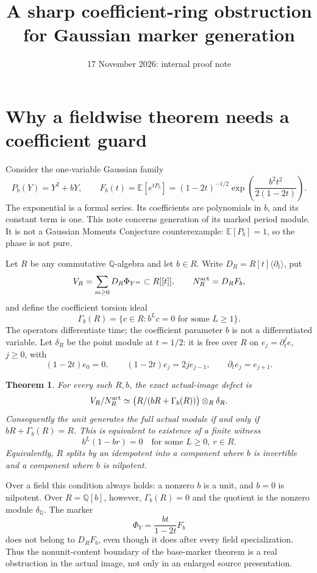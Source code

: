 \documentclass[11pt]{article}
\title{A sharp coefficient-ring obstruction\\for Gaussian marker generation}
\author{}\date{17 November 2026: internal proof note}
\newtheorem{theorem}{Theorem}[section]
\theoremstyle{definition}\newtheorem{definition}[theorem]{Definition}
\theoremstyle{remark}\newtheorem{remark}[theorem]{Remark}
\newcommand{\E}{\mathbb E}
\begin{document}
\maketitle

\section{Why a fieldwise theorem needs a coefficient guard}

Consider the one-variable Gaussian family
\[
 P_b(Y)=Y^2+bY,\qquad
 F_b(t)=\E[e^{tP_b}]
   =(1-2t)^{-1/2}\exp\!\left(\frac{b^2t^2}{2(1-2t)}\right).
\]
The exponential is a formal series. Its coefficients are polynomials
in $b$, and its constant term is one. This note concerns generation
of its marked period module. It is not a Gaussian Moments Conjecture
counterexample: $\E[P_b]=1$, so the phase is not pure.

Let $R$ be any commutative $\mathbb Q$-algebra and let $b\in R$.
Write $D_R=R[t]\langle\partial_t\rangle$, put
\[
 V_R=\sum_{m\ge0}D_R\Phi_{Y^m}\subset R[[t]],\qquad
 N_R^{\rm act}=D_RF_b,
\]
and define the coefficient torsion ideal
\[
 \Gamma_b(R)=\{c\in R:b^Lc=0\text{ for some }L\ge1\}.
\]
The operators differentiate time; the coefficient parameter $b$
is not a differentiated variable.
Let $\delta_R$ be the point module at $t=1/2$: it is free over
$R$ on $e_j=\partial_t^j e$, $j\ge0$, with
\[
 (1-2t)e_0=0,\qquad
 (1-2t)e_j=2j e_{j-1},\qquad\partial_t e_j=e_{j+1}.
\]

\begin{theorem}\label{thm:allrings}
For every such $R,b$, the exact actual-image defect is
\begin{equation}\label{eq:defect}
 V_R/N_R^{\rm act}\simeq
     \bigl(R/(bR+\Gamma_b(R))\bigr)\otimes_R\delta_R.
\end{equation}
Consequently the unit generates the full actual module if and
only if $bR+\Gamma_b(R)=R$. This is equivalent to existence of
a finite witness
\begin{equation}\label{eq:stabilization}
 b^L(1-br)=0\quad\text{for some }L\ge0,\ r\in R.
\end{equation}
Equivalently, $R$ splits by an idempotent into a component where
$b$ is invertible and a component where $b$ is nilpotent.
\end{theorem}

Over a field this condition always holds: a nonzero $b$ is a unit,
and $b=0$ is nilpotent. Over $R=\mathbb Q[b]$, however,
$\Gamma_b(R)=0$ and the quotient is the nonzero module
$\delta_{\mathbb Q}$. The marker
\[
 \Phi_Y=\frac{bt}{1-2t}F_b
\]
does not belong to $D_RF_b$, even though it does after every
field specialization. Thus the nonunit-content boundary of the
base-marker theorem is a real obstruction in the actual image,
not only in an enlarged source presentation.
\end{document}
